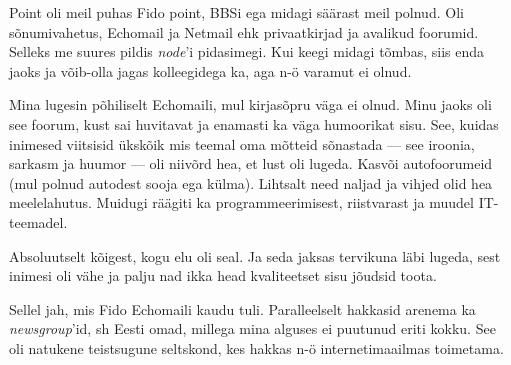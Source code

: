 
Point oli meil puhas Fido point, BBSi ega midagi säärast meil polnud. 
Oli sõnumivahetus, Echomail ja Netmail ehk 
privaatkirjad ja avalikud foorumid. Selleks me 
suures pildis \emph{node}'i pidasimegi. Kui keegi midagi tõmbas, siis enda jaoks ja võib-olla jagas kolleegidega ka, aga n-ö varamut ei olnud.


Mina lugesin põhiliselt Echomaili, mul kirjasõpru väga ei olnud. Minu 
jaoks oli see foorum, kust sai huvitavat ja enamasti ka väga 
humoorikat sisu. See, kuidas inimesed viitsisid ükskõik mis teemal 
oma mõtteid sõnastada --- see iroonia, sarkasm ja huumor --- oli niivõrd hea, et lust oli 
lugeda. Kasvõi autofoorumeid (mul polnud autodest sooja ega külma). Lihtsalt need naljad ja vihjed olid hea 
meelelahutus. Muidugi räägiti ka programmeerimisest, riistvarast ja 
muudel IT-teemadel.


Absoluutselt kõigest, kogu elu oli seal. Ja seda jaksas tervikuna 
läbi lugeda, sest inimesi oli vähe ja palju nad ikka head kvaliteetset sisu 
jõudsid toota.


Sellel jah, mis Fido Echomaili kaudu tuli. Paralleelselt 
hakkasid arenema ka \emph{newsgroup}'id, sh Eesti omad, millega mina 
alguses ei puutunud eriti kokku. See oli natukene teistsugune seltskond, kes hakkas n-ö internetimaailmas toimetama. 


